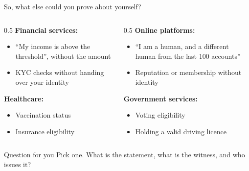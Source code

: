 \ifdefined\PRESENTATION\else\PassOptionsToClass{handout}{beamer}\fi\documentclass[aspectratio=169, lualatex]{beamer}
\begin{document}
\begin{frame}{So, what else could you prove about yourself?}
	\begin{columns}[c]
		\begin{column}{0.5\textwidth}
			\textbf{Financial services:}
			\begin{itemize}
				\item ``My income is above the threshold'', without the amount
				\item KYC checks without handing over your identity
			\end{itemize}
			\textbf{Healthcare:}
			\begin{itemize}
				\item Vaccination status
				\item Insurance eligibility
			\end{itemize}
		\end{column}
		\begin{column}{0.5\textwidth}
			\textbf{Online platforms:}
			\begin{itemize}
				\item ``I am a human, and a different human from the last 100 accounts''
				\item Reputation or membership without identity
			\end{itemize}
			\textbf{Government services:}
			\begin{itemize}
				\item Voting eligibility
				\item Holding a valid driving licence
			\end{itemize}
		\end{column}
	\end{columns}
	\vspace{0.3cm}
	\begin{block}{Question for you}
		Pick one. What is the statement, what is the witness, and who issues it?
	\end{block}
\end{frame}
\end{document}
